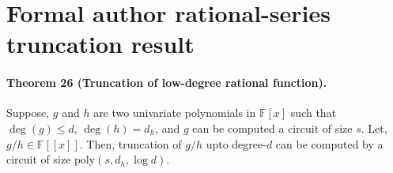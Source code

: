 \section*{Formal author rational-series truncation result}
\paragraph{Theorem 26 (Truncation of low-degree rational function).} Suppose, $g$ and $h$ are two univariate polynomials in $\mathbb F[x]$ such that $\deg(g)\le d$, $\deg(h)=d_h$, and $g$ can be computed a circuit of size $s$. Let, $g/h\in\mathbb F[[x]]$. Then, truncation of $g/h$ upto degree-$d$ can be computed by a circuit of size $\mathrm{poly}(s,d_h,\log d)$.
